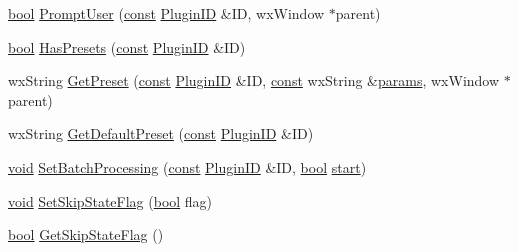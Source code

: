 \begin{DoxyCompactItemize}
\hyperlink{mac_2config_2i386_2lib-src_2libsoxr_2soxr-config_8h_abb452686968e48b67397da5f97445f5b}{bool} \hyperlink{class_effect_manager_ad8718cbf87ba19fb81908796efc50f3e}{Prompt\+User} (\hyperlink{getopt1_8c_a2c212835823e3c54a8ab6d95c652660e}{const} \hyperlink{include_2audacity_2_types_8h_abe9b737fcebc2b5bea606246e1eab52e}{Plugin\+ID} \&ID, wx\+Window $\ast$parent)
\item 
\hyperlink{mac_2config_2i386_2lib-src_2libsoxr_2soxr-config_8h_abb452686968e48b67397da5f97445f5b}{bool} \hyperlink{class_effect_manager_a2a20da3576fb52592ec7b4f18d7773ba}{Has\+Presets} (\hyperlink{getopt1_8c_a2c212835823e3c54a8ab6d95c652660e}{const} \hyperlink{include_2audacity_2_types_8h_abe9b737fcebc2b5bea606246e1eab52e}{Plugin\+ID} \&ID)
\item 
wx\+String \hyperlink{class_effect_manager_adc7c41b8f952535c7c02dd183fdf370b}{Get\+Preset} (\hyperlink{getopt1_8c_a2c212835823e3c54a8ab6d95c652660e}{const} \hyperlink{include_2audacity_2_types_8h_abe9b737fcebc2b5bea606246e1eab52e}{Plugin\+ID} \&ID, \hyperlink{getopt1_8c_a2c212835823e3c54a8ab6d95c652660e}{const} wx\+String \&\hyperlink{_reverb_8cpp_aacc5617877d2aa4d17c729c1c8ba4eec}{params}, wx\+Window $\ast$parent)
\item 
wx\+String \hyperlink{class_effect_manager_aa24cdf2e97d9f8c384205abcab30c829}{Get\+Default\+Preset} (\hyperlink{getopt1_8c_a2c212835823e3c54a8ab6d95c652660e}{const} \hyperlink{include_2audacity_2_types_8h_abe9b737fcebc2b5bea606246e1eab52e}{Plugin\+ID} \&ID)
\item 
\hyperlink{sound_8c_ae35f5844602719cf66324f4de2a658b3}{void} \hyperlink{class_effect_manager_a876762a8e2b576f424651edad9145460}{Set\+Batch\+Processing} (\hyperlink{getopt1_8c_a2c212835823e3c54a8ab6d95c652660e}{const} \hyperlink{include_2audacity_2_types_8h_abe9b737fcebc2b5bea606246e1eab52e}{Plugin\+ID} \&ID, \hyperlink{mac_2config_2i386_2lib-src_2libsoxr_2soxr-config_8h_abb452686968e48b67397da5f97445f5b}{bool} \hyperlink{seqread_8c_ac503262ae470564980711da4f78b1181}{start})
\item 
\hyperlink{sound_8c_ae35f5844602719cf66324f4de2a658b3}{void} \hyperlink{class_effect_manager_a325e912e7f378e8d791a55c3304d6344}{Set\+Skip\+State\+Flag} (\hyperlink{mac_2config_2i386_2lib-src_2libsoxr_2soxr-config_8h_abb452686968e48b67397da5f97445f5b}{bool} flag)
\item 
\hyperlink{mac_2config_2i386_2lib-src_2libsoxr_2soxr-config_8h_abb452686968e48b67397da5f97445f5b}{bool} \hyperlink{class_effect_manager_a2e5a85abab4f1ab60542be9bd23adcd0}{Get\+Skip\+State\+Flag} ()

\end{DoxyCompactItemize}
